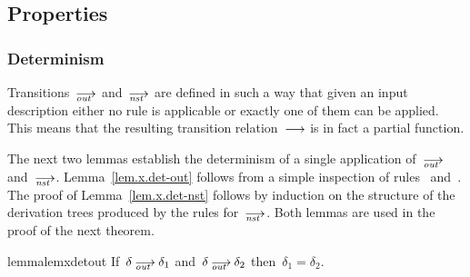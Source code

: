 

\subsection{Properties}


\subsubsection{Determinism}

Transitions~$\out$ and~$\nst$ are defined in such a way that given an input
description either no rule is applicable or exactly one of them can be
applied.  This means that the resulting transition relation~$\trans$ is in
fact a partial function.

The next two lemmas establish the determinism of a single application
of~$\out$ and~$\nst$.  Lemma~\ref{lem.x.det-out} follows from a simple
inspection of rules~ and~.  The proof of
Lemma~\ref{lem.x.det-nst} follows by induction on the structure
of the derivation trees produced by the rules for~$\nst$.  Both lemmas are
used in the proof of the next theorem.

\begin{restatable}{lemma}{lemxdetout}
  \label{lem.x.det-out}
  If~$\delta\out\delta_1$ and~$\delta\out\delta_2$ then~$\delta_1=\delta_2$.
\end{restatable}

